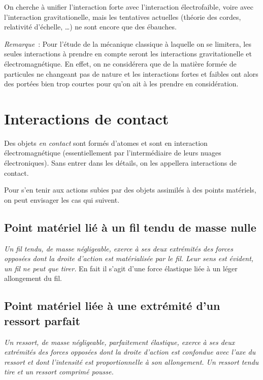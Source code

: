 On cherche à unifier l'interaction forte avec l'interaction électrofaible, voire avec l'interaction gravitationelle, mais les tentatives actuelles (théorie des cordes, relativité d'échelle, \ldots) ne sont encore que des ébauches.

\emph{Remarque}~: Pour l'étude de la mécanique classique à laquelle on se limitera, les seules interactions à prendre en compte seront les interactions gravitationelle et électromagnétique. En effet, on ne considérera que de la matière formée de particules ne changeant pas de nature et les interactions fortes et faibles ont alors des portées bien trop courtes pour qu'on ait à les prendre en considération.

\section{Interactions de contact}
\label{chap2-sec:interactiondecontac}

Des objets \emph{en contact} sont formés d'atomes et sont en interaction électromagnétique (essentiellement par l'intermédiaire de leurs nuages électroniques). Sans entrer dans les détails, on les appellera interactions de contact.

Pour s'en tenir aux actions subies par des objets assimilés à des points matériels, on peut envisager les cas qui suivent.

\subsection{Point matériel lié à un fil tendu de masse nulle}
\label{chap2-subsec:filtendu}

\emph{Un fil tendu, de masse négligeable, exerce à ses deux extrémités des forces opposées dont la droite d'action est matérialisée par le fil. Leur sens est évident, un fil ne peut que tirer.} En fait il s'agit d'une force élastique liée à un léger allongement du fil.

\subsection{Point matériel liée à une extrémité d'un ressort parfait}
\label{chap2-subsec:ressort}

\emph{Un ressort, de masse négligeable, parfaitement élastique, exerce à ses deux extrémités des forces opposées dont la droite d'action est confondue avec l'axe du ressort et dont l'intensité est proportionnelle à son allongement. Un ressort tendu tire et un ressort comprimé pousse.}

